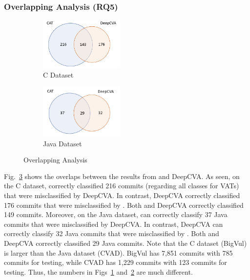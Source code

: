 \subsubsection{\bf Overlapping Analysis (RQ5)}

\begin{figure}
	\centering
	\begin{subfigure}{0.235\textwidth}
		\centering
		\includegraphics[width=1.65in]{graphs/Overlap-1.png}
		\vspace{-16pt}
		\caption{C Dataset}
		\label{RQ3-result-1}
	\end{subfigure}
	\begin{subfigure}{0.235\textwidth}
		\centering
		\includegraphics[width=1.65in]{graphs/Overlap-2.png}
		\vspace{-16pt}
		\caption{Java Dataset}
		\label{RQ3-result-2}
	\end{subfigure}
	\vspace{-6pt}
	\caption{Overlapping Analysis}
	\label{RQ3-result}
\end{figure}

Fig.~\ref{RQ3-result} shows the overlaps between the results from
{\tool} and DeepCVA. As seen, on the C dataset, {\tool} correctly
classified 216 commits (regarding all classes for VATs) that were
misclassified by DeepCVA. In contrast, DeepCVA correctly classified
176 commits that were misclassified by {\tool}. Both {\tool} and
DeepCVA correctly classified 149 commits. Moreover, on the Java
dataset, {\tool} can correctly classify 37 Java commits that were
misclassified by DeepCVA. In contrast, DeepCVA can correctly classify
32 Java commits that were misclassified by {\tool}. Both {\tool} and
DeepCVA correctly classified 29 Java commits. Note that the C dataset
(BigVul) is larger than the Java dataset (CVAD). BigVul has 7,851
commits with 785 commits for testing, while CVAD has 1,229 commits
with 123 commits for testing. Thus, the numbers in
Figs~\ref{RQ3-result-1} and~\ref{RQ3-result-2} are much different.


